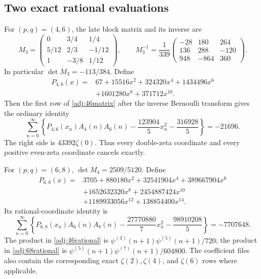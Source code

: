 \subsection{Two exact rational evaluations}

For $(p,q)=(4,6)$, the late block matrix and its inverse are
\begin{equation}\label{adj:46matrix}
 M_3=\begin{pmatrix}
 0&3/4&1/4\\5/12&2/3&-1/12\\1&-3/8&1/12
 \end{pmatrix},\qquad
 M_3^{-1}=\frac1{339}
 \begin{pmatrix}-28&180&264\\136&288&-120\\948&-864&360\end{pmatrix}.
\end{equation}
In particular $\det M_3=-113/384$.  Define
\begin{equation}\label{adj:P46}
 \begin{split}
 P_{4,6}(x)={}&67+15516x^2+324320x^4+1434496x^6\\
             &+1601280x^8+371712x^{10}.
 \end{split}
\end{equation}
Then the first row of \eqref{adj:46matrix} after the inverse
Bernoulli transform gives the ordinary identity
\begin{equation}\label{adj:46rational}
 \sum_{n=0}^{\infty}\left\{
 P_{4,6}(x_n)A_4(n)A_6(n)
 -\frac{123904}{5}x_n^2-\frac{316928}{5}
 \right\}=-21696.
\end{equation}
The right side is $43392\zeta(0)$.  Thus every double-zeta
coordinate and every positive even-zeta coordinate cancels
exactly.

For $(p,q)=(6,8)$, $\det M_4=2509/5120$.  Define
\begin{equation}\label{adj:P68}
 \begin{split}
 P_{6,8}(x)={}&3705+880180x^2+32541904x^4+389667904x^6\\
 &+1652632320x^8+2454887424x^{10}\\
 &+1189933056x^{12}+138854400x^{14}.
 \end{split}
\end{equation}
Its rational-coordinate identity is
\begin{equation}\label{adj:68rational}
 \sum_{n=0}^{\infty}\left\{
 P_{6,8}(x_n)A_6(n)A_8(n)
 -\frac{27770880}{7}x_n^2-\frac{98910208}{5}
 \right\}=-7707648.
\end{equation}
The product in \eqref{adj:46rational} is
$\psi^{(3)}(n+1)\psi^{(5)}(n+1)/720$; the product in
\eqref{adj:68rational} is
$\psi^{(5)}(n+1)\psi^{(7)}(n+1)/604800$.
The coefficient files also contain the corresponding exact
$\zeta(2),\zeta(4)$, and $\zeta(6)$ rows where applicable.

